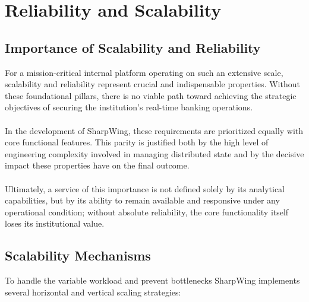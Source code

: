 \documentclass[12pt]{report}
\begin{document}
\chapter{Reliability and Scalability}
\label{ch:reliability_scalability}

\section{Importance of Scalability and Reliability}

For a mission-critical internal platform operating on such an extensive scale, scalability and reliability represent crucial and indispensable properties. Without these foundational pillars, there is no viable path toward achieving the strategic objectives of securing the institution's real-time banking operations. \\\\
In the development of SharpWing, these requirements are prioritized equally with core functional features. This parity is justified both by the high level of engineering complexity involved in managing distributed state and by the decisive impact these properties have on the final outcome.\\\\
Ultimately, a service of this importance is not defined solely by its analytical capabilities, but by its ability to remain available and responsive under any operational condition; without absolute reliability, the core functionality itself loses its institutional value.

\section{Scalability Mechanisms}
To handle the variable workload and prevent bottlenecks SharpWing implements several horizontal and vertical scaling strategies:
\end{document}
